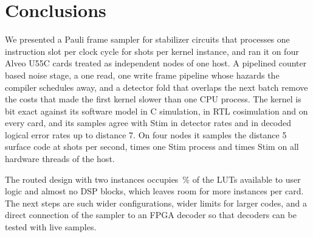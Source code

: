 \section{Conclusions}\label{sec:conclusions}

We presented a Pauli frame sampler for stabilizer circuits that processes one instruction slot per clock cycle for
\NumLanes{} shots per kernel instance, and ran it on four Alveo U55C cards treated as independent nodes of one host. A pipelined
counter based noise stage, a one read, one write frame pipeline whose hazards the compiler schedules away, and a
detector fold that overlaps the next batch remove the costs that made the first kernel slower than one CPU process. The kernel is bit
exact against its software model in C simulation, in RTL cosimulation and on every card, and its samples agree with
Stim in detector rates and in decoded logical error rates up to distance 7. On four nodes it samples the distance 5
surface code at \NumFpgaFourSurfFive{} shots per second, \NumRatioOneSurfFive{} times one Stim process and
\NumRatioAllSurfFive{} times Stim on all \NumHostThreads{} hardware threads of the host.

The routed design with two instances occupies \NumRoutedLutPct\,\% of the LUTs available to user logic and almost
no DSP blocks, which leaves room for more instances per card. The next steps are such wider configurations, wider
limits for larger codes, and a direct connection of the sampler to an FPGA decoder so that decoders can be tested
with live samples.
